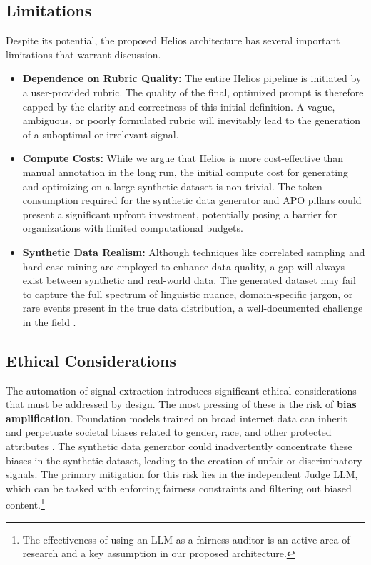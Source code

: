 \documentclass{article}
\begin{document}
\subsection{Limitations}
Despite its potential, the proposed Helios architecture has several important limitations that warrant discussion.
\begin{itemize}
  \item \textbf{Dependence on Rubric Quality:} The entire Helios pipeline is initiated by a user-provided rubric. The quality of the final, optimized prompt is therefore capped by the clarity and correctness of this initial definition. A vague, ambiguous, or poorly formulated rubric will inevitably lead to the generation of a suboptimal or irrelevant signal.
  \item \textbf{Compute Costs:} While we argue that Helios is more cost-effective than manual annotation in the long run, the initial compute cost for generating and optimizing on a large synthetic dataset is non-trivial. The token consumption required for the synthetic data generator and APO pillars could present a significant upfront investment, potentially posing a barrier for organizations with limited computational budgets.
  \item \textbf{Synthetic Data Realism:} Although techniques like correlated sampling and hard-case mining are employed to enhance data quality, a gap will always exist between synthetic and real-world data. The generated dataset may fail to capture the full spectrum of linguistic nuance, domain-specific jargon, or rare events present in the true data distribution, a well-documented challenge in the field \citep{nadas2025syntheticdatagenerationusing}.
\end{itemize}

\subsection{Ethical Considerations}
The automation of signal extraction introduces significant ethical considerations that must be addressed by design. The most pressing of these is the risk of \textbf{bias amplification}. Foundation models trained on broad internet data can inherit and perpetuate societal biases related to gender, race, and other protected attributes \citep{yu2023largelanguagemodelattributed}. The synthetic data generator could inadvertently concentrate these biases in the synthetic dataset, leading to the creation of unfair or discriminatory signals. The primary mitigation for this risk lies in the independent Judge LLM, which can be tasked with enforcing fairness constraints and filtering out biased content.\footnote{The effectiveness of using an LLM as a fairness auditor is an active area of research and a key assumption in our proposed architecture.}
\end{document}
